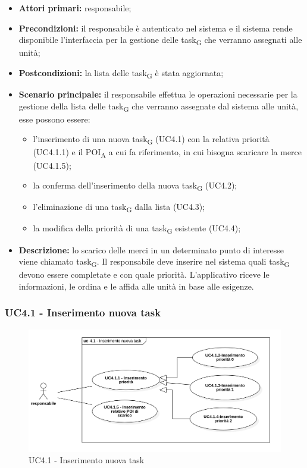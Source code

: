 \begin{itemize}
	\item 	\textbf{Attori primari:} responsabile;
	\item 	\textbf{Precondizioni:} il responsabile è autenticato nel sistema e il sistema rende disponibile l'interfaccia per la gestione delle task\textsubscript{G} che verranno assegnati alle unità;
	\item 	\textbf{Postcondizioni:} la lista delle task\textsubscript{G} è stata aggiornata;
	\item 	\textbf{Scenario principale:} il responsabile effettua le operazioni necessarie per la gestione della lista delle task\textsubscript{G} che verranno assegnate dal sistema alle unità, esse possono essere:
	\begin{itemize}
		\item l'inserimento di una nuova task\textsubscript{G} (UC4.1) con la relativa priorità (UC4.1.1) e il POI\textsubscript{A} a cui fa riferimento, in cui bisogna scaricare la merce (UC4.1.5);
		\item la conferma dell'inserimento della nuova task\textsubscript{G} (UC4.2);
		\item l'eliminazione di una task\textsubscript{G} dalla lista (UC4.3);
		\item la modifica della priorità di una task\textsubscript{G} esistente (UC4.4);
	\end{itemize}
	\item 	\textbf{Descrizione:} lo scarico delle merci in un determinato punto di interesse viene chiamato task\textsubscript{G}. Il responsabile deve inserire nel sistema quali task\textsubscript{G} devono essere completate e con quale priorità. L'applicativo riceve le informazioni, le ordina e le affida alle unità in base alle esigenze. 

\end{itemize}

\subsubsection{UC4.1 - Inserimento nuova task}

\begin{figure}[H]
	\centering
	\includegraphics[scale=0.52]{res/images/uc4-1.png}
	\caption{UC4.1 - Inserimento nuova task}
\end{figure}

